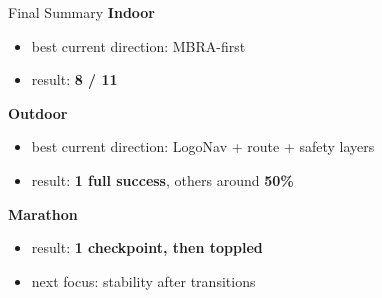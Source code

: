 \documentclass{beamer}
\begin{document}
\begin{frame}{Final Summary}
\textbf{Indoor}
\begin{itemize}
  \item best current direction: MBRA-first
  \item result: \textbf{8 / 11}
\end{itemize}

\textbf{Outdoor}
\begin{itemize}
  \item best current direction: LogoNav + route + safety layers
  \item result: \textbf{1 full success}, others around \textbf{50\%}
\end{itemize}

\textbf{Marathon}
\begin{itemize}
  \item result: \textbf{1 checkpoint, then toppled}
  \item next focus: stability after transitions
\end{itemize}
\end{frame}
\end{document}
